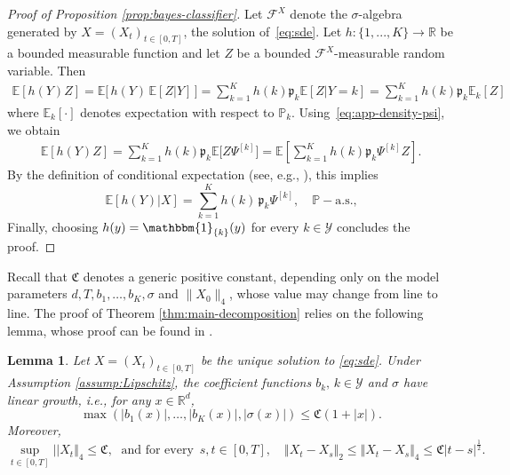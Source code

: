 \documentclass{article}
\theoremstyle{plain}
\newtheorem{lemma}[theorem]{Lemma}
\theoremstyle{definition}
\theoremstyle{remark}
\newcommand{\PP}{\mathbb{P}}
\newcommand{\RD}{\mathbb{R}^{d}}
\newcommand{\RR}{\mathbb{R}}
\newcommand{\EE}{\mathbb{E}}
\newcommand{\calY}{\mathcal{Y}}
\newcommand{\calF}{\mathcal{F}}
\begin{document}
\begin{proof}[Proof of Proposition \ref{prop:bayes-classifier}]
Let $\calF^X$ denote the $\sigma$-algebra generated by
$X = (X_t)_{t\in[0,T]}$, the solution of~\eqref{eq:sde}.
Let $h:\{1, ..., K\}\rightarrow \RR$ be a  bounded measurable function and let $Z$ be a bounded $\mathcal{F}^X$-measurable random variable. Then
\begin{align}
    \EE [h(Y)Z]= \EE\big[\,h(Y) \,\EE[Z|Y]\,\big] =\sum_{k=1}^K h(k)\mathfrak{p}_k \EE[Z|Y=k]=\sum_{k=1}^K h(k)\mathfrak{p}_k \EE_k[Z]
\end{align}
where $\EE_k[\cdot]$ denotes expectation with respect to $\PP_k$. 
Using~\eqref{eq:app-density-psi}, we obtain
\begin{align}
   \EE [h(Y)Z]= \sum_{k=1}^K h(k)\mathfrak{p}_k \EE\big[Z\Psi^{[k]}\big]=\EE \left[\sum_{k=1}^K h(k)\mathfrak{p}_k \Psi^{[k]} Z\right]. 
\end{align}
By the definition of conditional expectation
(see, e.g., \citet[Theorem and Definition~11.3]{legall2022measure}),
this implies
\begin{equation}\label{eq:app-cond-expectation}
    \EE[h(Y)|X]=\sum_{k=1}^K h(k)\,\mathfrak{p}_k \Psi^{[k]}, \quad \PP-\text{a.s.,}
\end{equation}
Finally, choosing $h(y) = \mathbbm{1}_{\{k\}}(y)$ for every $k \in \mathcal{Y}$
concludes the proof.
\end{proof}

Recall that \( \mathfrak{C} \) denotes a generic positive constant, depending only on the model parameters \( d, T, b_1,\ldots,b_K, \sigma \) and \( \|X_0\|_4 \), whose value may change from line to line.
 The proof of  Theorem \ref{thm:main-decomposition} relies on the following lemma, whose proof can be found in \citet[Lemma 7.4 and Proposition 7.6]{pages2018numerical}. 
\begin{lemma}\label{lem:properties-X}
Let $X=(X_t)_{t\in [0,T]}$ be the unique solution to \eqref{eq:sde}. Under Assumption \ref{assump:Lipschitz}, the coefficient functions $b_k, \,k\in\calY$ and $\sigma$ have linear growth, i.e., for any $x\in\RD$, %
\[\max (|b_1(x)|, \dots,|b_K(x)| , |\sigma(x)|)\leq \mathfrak{C}(1+|x|).  \]
Moreover, 
\[  \sup_{t\in[0,T]}|| X_t\Vert_4\leq \mathfrak{C}, \;  \textrm{ and for every } \,s,t\in[0,T], \quad \Vert X_t -X_s \Vert_2\leq \Vert X_t -X_s \Vert_4\leq \mathfrak{C} |t-s|^{\frac{1}{2}}. \]
\end{lemma}
\end{document}
